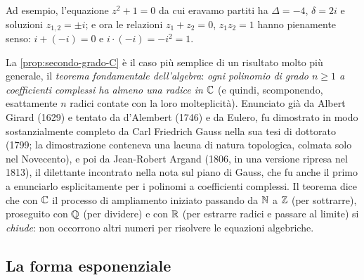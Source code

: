 Ad esempio, l'equazione $z^{2}+1=0$ da cui eravamo partiti ha $\Delta=-4$, $\delta=2i$ e
soluzioni $z_{1,2}=\pm i$; e ora le relazioni $z_{1}+z_{2}=0$, $z_{1}z_{2}=1$ hanno
pienamente senso: $i+(-i)=0$ e $i\cdot(-i)=-i^{2}=1$.

\begin{notastorica}
La \cref{prop:secondo-grado-C} è il caso più semplice di un risultato molto più
generale, il \emph{teorema fondamentale dell'algebra}: \emph{ogni polinomio di grado
$n\ge1$ a coefficienti complessi ha almeno una radice in $\mathbb{C}$} (e quindi, scomponendo,
esattamente $n$ radici contate con la loro molteplicità). Enunciato già da Albert Girard
(1629) e tentato da d'Alembert (1746) e da Eulero, fu dimostrato in modo sostanzialmente
completo da Carl Friedrich Gauss nella sua tesi di dottorato (1799; la dimostrazione
conteneva una lacuna di natura topologica, colmata solo nel Novecento), e poi da
Jean-Robert Argand (1806, in una versione ripresa nel 1813), il dilettante incontrato
nella nota sul piano di Gauss, che fu anche il primo a enunciarlo esplicitamente per i
polinomi a coefficienti complessi. Il teorema dice che con $\mathbb{C}$ il processo di ampliamento iniziato passando da $\mathbb{N}$
a $\mathbb{Z}$ (per sottrarre), proseguito con $\mathbb{Q}$ (per dividere) e con $\mathbb{R}$ (per estrarre radici
e passare al limite) si \emph{chiude}: non occorrono altri numeri per risolvere le equazioni
algebriche.
\end{notastorica}

\subsection{La forma esponenziale}

